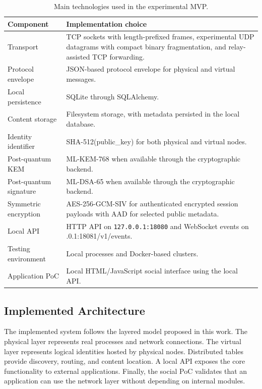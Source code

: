 \documentclass[12pt,a4paper]{article}
\newcommand{\codebreak}[1]{{\footnotesize\ttfamily #1}}
\begin{document}
\begin{table}[H]
\centering
\caption{Main technologies used in the experimental MVP.}
\label{tab:implementation-stack}
\begin{tabularx}{\textwidth}{L{0.24\textwidth} Y}
\toprule
\textbf{Component} & \textbf{Implementation choice} \\
\midrule
Transport & TCP sockets with length-prefixed frames, experimental UDP datagrams with compact binary fragmentation, and relay-assisted TCP forwarding. \\
Protocol envelope & JSON-based protocol envelope for physical and virtual messages. \\
Local persistence & SQLite through SQLAlchemy. \\
Content storage & Filesystem storage, with metadata persisted in the local database. \\
Identity identifier & \codebreak{SHA-512(public\_\allowbreak{}key)} for both physical and virtual nodes. \\
Post-quantum KEM & ML-KEM-768 when available through the cryptographic backend. \\
Post-quantum signature & ML-DSA-65 when available through the cryptographic backend. \\
Symmetric encryption & AES-256-GCM-SIV for authenticated encrypted session payloads with AAD for selected public metadata. \\
Local API & HTTP API on \texttt{127.0.0.1:18080} and WebSocket events on \codebreak{127.0.0.1:\allowbreak{}18081/\allowbreak{}v1/\allowbreak{}events}. \\
Testing environment & Local processes and Docker-based clusters. \\
Application PoC & Local HTML/JavaScript social interface using the local API. \\
\bottomrule
\end{tabularx}
\end{table}

\subsection{Implemented Architecture}
\label{sec:implemented-architecture}

The implemented system follows the layered model proposed in this work. The physical layer represents real processes and network connections. The virtual layer represents logical identities hosted by physical nodes. Distributed tables provide discovery, routing, and content location. A local API exposes the core functionality to external applications. Finally, the social PoC validates that an application can use the network layer without depending on internal modules.
\end{document}
